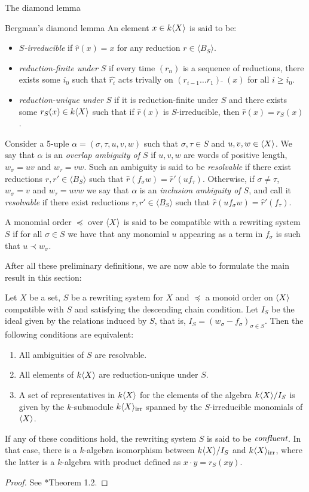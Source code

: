\begin{chapter}{The diamond lemma}
\begin{section}{Bergman's diamond lemma}
An element $x\in k\langle X\rangle$ is said to be:
\begin{itemize}
\item \emph{$S$-irreducible} if $\hat{r}(x)=x$ for any reduction $r\in\langle B_S\rangle$.
\item \emph{reduction-finite under $S$} if every time $(r_n)$ is a sequence of reductions, there exists some $i_0$ such that $\hat{r_i}$ acts trivally on $(r_{i-1}\dots r_1)\,\widehat{\,}\,(x) $ for all $i\geq i_0$.
\item \emph{reduction-unique under $S$} if it is reduction-finite under $S$ and there exists some $r_S(x)\in k\langle X\rangle$ such that if $\hat{r}(x)$ is $S$-irreducible, then $\hat{r}(x) = r_S(x)$.
\end{itemize}

Consider a 5-uple $\alpha=(\sigma, \tau, u,v,w)$ such that $\sigma,\tau\in S$ and $u,v,w\in \langle X\rangle$. We say that $\alpha$ is an \emph{overlap ambiguity of $S$} if $u,v,w$ are words of positive length, $w_\sigma =uv$ and $w_\tau=vw$. Such an ambiguity is said to be \emph{resolvable} if there exist reductions $r,r'\in \langle B_S\rangle$ such that $\hat{r}(f_\sigma w)=\hat{r}'(uf_\tau)$. Otherwise, if $\sigma\neq \tau$, $w_\sigma=v$ and $w_\tau=uvw$ we say that $\alpha$ is an \emph{inclusion ambiguity of $S$}, and call it \emph{resolvable} if there exist reductions $r,r'\in \langle B_S\rangle$ such that $\hat{r}(uf_\sigma w)=\hat{r}'(f_\tau)$.

A monomial order $\preceq$ over $\langle X\rangle$ is said to be compatible with a rewriting system $S$ if for all $\sigma \in S$ we have that any monomial $u$ appearing as a term in $f_\sigma$ is such that $u \prec w_\sigma$.

After all these preliminary definitions, we are now able to formulate the main result in this section:

\begin{thm} Let $X$ be a set, $S$ be a rewriting system for $X$ and $\preceq$ a monoid order on $\langle X\rangle$ compatible with $S$ and satisfying the descending chain condition. Let $I_S$ be the ideal given by the relations induced by $S$, that is, $I_S=(w_\sigma-f_\sigma)_{\sigma\in S}$. Then the following conditions are equivalent:
\begin{enumerate}
\item All ambiguities of $S$ are resolvable.
\item All elements of $k\langle X\rangle$ are reduction-unique under $S$.
\item A set of representatives in $k\langle X\rangle$ for the elements of the algebra $k\langle X\rangle/I_S$ is given by the $k$-submodule $k\langle X\rangle_{\mathrm{irr}}$ spanned by the $S$-irreducible monomials of $\langle X\rangle$.
\end{enumerate}
If any of these conditions hold, the rewriting system $S$ is said to be $\emph{confluent}$. In that case, there is a $k$-algebra isomorphism between $k\langle X\rangle/I_S$ and $k\langle X\rangle_{\mathrm{irr}}$, where the latter is a $k$-algebra with product defined as $x\cdot y= r_S(xy)$.
\end{thm}
\begin{proof} See {\cite{Ber78}*{Theorem 1.2}}.
\end{proof}


\end{section}
\end{chapter}
